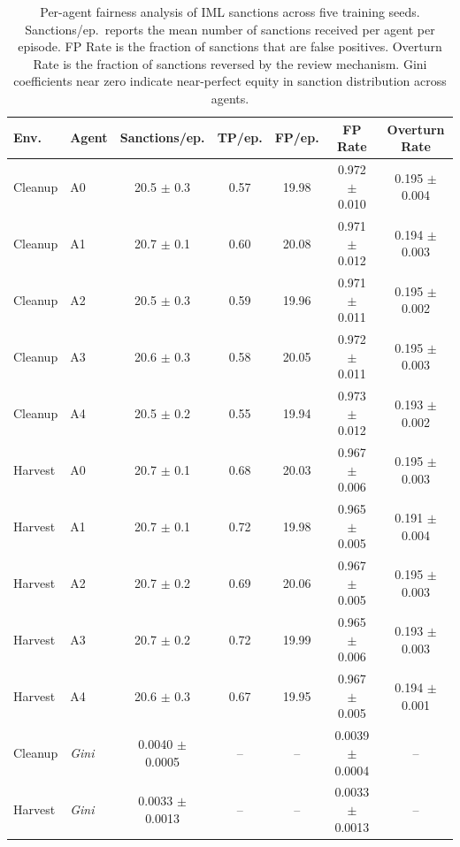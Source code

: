 \begin{table}[htbp]
\centering
\caption{Per-agent fairness analysis of IML sanctions across five training seeds. Sanctions/ep.\ reports the mean number of sanctions received per agent per episode. FP Rate is the fraction of sanctions that are false positives. Overturn Rate is the fraction of sanctions reversed by the review mechanism. Gini coefficients near zero indicate near-perfect equity in sanction distribution across agents.}
\label{tab:fairness}
\begin{tabular}{llccccc}
\toprule
\textbf{Env.} & \textbf{Agent} & \textbf{Sanctions/ep.} & \textbf{TP/ep.} & \textbf{FP/ep.} & \textbf{FP Rate} & \textbf{Overturn Rate} \\
\midrule
Cleanup & A0 & 20.5 $\pm$ 0.3 & 0.57 & 19.98 & 0.972 $\pm$ 0.010 & 0.195 $\pm$ 0.004 \\
Cleanup & A1 & 20.7 $\pm$ 0.1 & 0.60 & 20.08 & 0.971 $\pm$ 0.012 & 0.194 $\pm$ 0.003 \\
Cleanup & A2 & 20.5 $\pm$ 0.3 & 0.59 & 19.96 & 0.971 $\pm$ 0.011 & 0.195 $\pm$ 0.002 \\
Cleanup & A3 & 20.6 $\pm$ 0.3 & 0.58 & 20.05 & 0.972 $\pm$ 0.011 & 0.195 $\pm$ 0.003 \\
Cleanup & A4 & 20.5 $\pm$ 0.2 & 0.55 & 19.94 & 0.973 $\pm$ 0.012 & 0.193 $\pm$ 0.002 \\
\midrule
Harvest & A0 & 20.7 $\pm$ 0.1 & 0.68 & 20.03 & 0.967 $\pm$ 0.006 & 0.195 $\pm$ 0.003 \\
Harvest & A1 & 20.7 $\pm$ 0.1 & 0.72 & 19.98 & 0.965 $\pm$ 0.005 & 0.191 $\pm$ 0.004 \\
Harvest & A2 & 20.7 $\pm$ 0.2 & 0.69 & 20.06 & 0.967 $\pm$ 0.005 & 0.195 $\pm$ 0.003 \\
Harvest & A3 & 20.7 $\pm$ 0.2 & 0.72 & 19.99 & 0.965 $\pm$ 0.006 & 0.193 $\pm$ 0.003 \\
Harvest & A4 & 20.6 $\pm$ 0.3 & 0.67 & 19.95 & 0.967 $\pm$ 0.005 & 0.194 $\pm$ 0.001 \\
\midrule
Cleanup & \textit{Gini} & 0.0040 $\pm$ 0.0005 & -- & -- & 0.0039 $\pm$ 0.0004 & -- \\
\midrule
Harvest & \textit{Gini} & 0.0033 $\pm$ 0.0013 & -- & -- & 0.0033 $\pm$ 0.0013 & -- \\
\bottomrule
\end{tabular}
\end{table}
